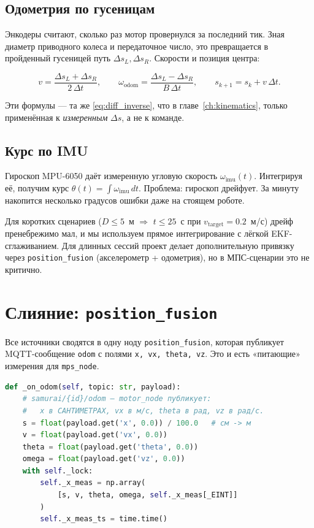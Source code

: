 \subsection{Одометрия по гусеницам}

Энкодеры считают, сколько раз мотор провернулся за последний тик.
Зная диаметр приводного колеса и передаточное число, это превращается
в пройденный гусеницей путь $\Delta s_L, \Delta s_R$. Скорости и
позиция центра:

\begin{equation}
  v = \frac{\Delta s_L + \Delta s_R}{2\,\Delta t},
  \qquad
  \omega_\text{odom} = \frac{\Delta s_L - \Delta s_R}{B\,\Delta t},
  \qquad
  s_{k+1} = s_k + v\,\Delta t.
\end{equation}

Эти формулы --- та же \eqref{eq:diff_inverse}, что в главе~\ref{ch:kinematics},
только применённая к \emph{измеренным} $\Delta s$, а не к команде.

\subsection{Курс по IMU}

Гироскоп MPU-6050 даёт измеренную угловую скорость $\omega_\text{imu}(t)$.
Интегрируя её, получим курс $\theta(t) = \int \omega_\text{imu}\,dt$.
Проблема: гироскоп дрейфует. За минуту накопится несколько градусов
ошибки даже на стоящем роботе.

Для коротких сценариев ($D \le 5$~м $\Rightarrow$ $t \le 25$~с при
$v_\text{target} = 0.2$~м/с) дрейф пренебрежимо мал, и мы используем
прямое интегрирование с лёгкой EKF-сглаживанием. Для длинных сессий
проект делает дополнительную привязку через \texttt{position\_fusion}
(акселерометр + одометрия), но в МПС-сценарии это не критично.

\section{Слияние: \texttt{position\_fusion}}

Все источники сводятся в одну ноду \texttt{position\_fusion}, которая
публикует MQTT-сообщение \texttt{odom} с полями \texttt{x, vx, theta, vz}.
Это и есть «питающие» измерения для \texttt{mps\_node}.

\begin{codebox}[title={\filepath{pi\_nodes/nodes/mps\_node.py:342}}]
\begin{lstlisting}[language=Python]
def _on_odom(self, topic: str, payload):
    # samurai/{id}/odom — motor_node публикует:
    #   x в САНТИМЕТРАХ, vx в м/с, theta в рад, vz в рад/с.
    s = float(payload.get('x', 0.0)) / 100.0   # см -> м
    v = float(payload.get('vx', 0.0))
    theta = float(payload.get('theta', 0.0))
    omega = float(payload.get('vz', 0.0))
    with self._lock:
        self._x_meas = np.array(
            [s, v, theta, omega, self._x_meas[_EINT]]
        )
        self._x_meas_ts = time.time()
\end{lstlisting}
\end{codebox}


